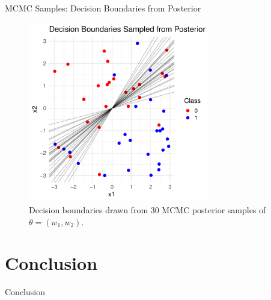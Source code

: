 \documentclass{beamer}
\begin{document}
\begin{frame}{MCMC Samples: Decision Boundaries from Posterior}
  \begin{figure}
    \centering
    \includegraphics[width=0.7\textwidth]{mcmc.pdf}
    \caption{Decision boundaries drawn from 30 MCMC posterior samples of \(\theta = (w_1, w_2)\).}
  \end{figure}
\end{frame}

\section{Conclusion}

\begin{frame}{Conclusion}
\end{frame}
\end{document}
